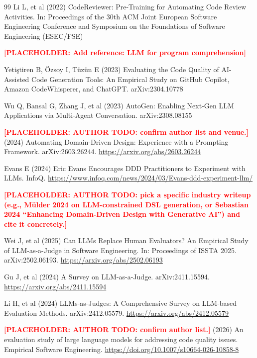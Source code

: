 \documentclass[smallextended]{svjour3}
\newcommand{\placeholder}[1]{\textcolor{red}{\textbf{[PLACEHOLDER: #1]}}}
\begin{document}
\begin{thebibliography}{99}
Li L, et al (2022) CodeReviewer: Pre-Training for Automating Code Review Activities. In: Proceedings of the 30th ACM Joint European Software Engineering Conference and Symposium on the Foundations of Software Engineering (ESEC/FSE)

\placeholder{Add reference: LLM for program comprehension}

Yetiştiren B, Özsoy I, Tüzün E (2023) Evaluating the Code Quality of AI-Assisted Code Generation Tools: An Empirical Study on GitHub Copilot, Amazon CodeWhisperer, and ChatGPT. arXiv:2304.10778

Wu Q, Bansal G, Zhang J, et al (2023) AutoGen: Enabling Next-Gen LLM Applications via Multi-Agent Conversation. arXiv:2308.08155

\placeholder{AUTHOR TODO: confirm author list and venue.} (2024) Automating Domain-Driven Design: Experience with a Prompting Framework. arXiv:2603.26244. \url{https://arxiv.org/abs/2603.26244}

Evans E (2024) Eric Evans Encourages DDD Practitioners to Experiment with LLMs. InfoQ. \url{https://www.infoq.com/news/2024/03/Evans-ddd-experiment-llm/}

\placeholder{AUTHOR TODO: pick a specific industry writeup (e.g., Mülder 2024 on LLM-constrained DSL generation, or Sebastian 2024 ``Enhancing Domain-Driven Design with Generative AI'') and cite it concretely.}

Wei J, et al (2025) Can LLMs Replace Human Evaluators? An Empirical Study of LLM-as-a-Judge in Software Engineering. In: Proceedings of ISSTA 2025. arXiv:2502.06193. \url{https://arxiv.org/abs/2502.06193}

Gu J, et al (2024) A Survey on LLM-as-a-Judge. arXiv:2411.15594. \url{https://arxiv.org/abs/2411.15594}

Li H, et al (2024) LLMs-as-Judges: A Comprehensive Survey on LLM-based Evaluation Methods. arXiv:2412.05579. \url{https://arxiv.org/abs/2412.05579}

\placeholder{AUTHOR TODO: confirm author list.} (2026) An evaluation study of large language models for addressing code quality issues. Empirical Software Engineering. \url{https://doi.org/10.1007/s10664-026-10858-8}


\end{thebibliography}
\end{document}
